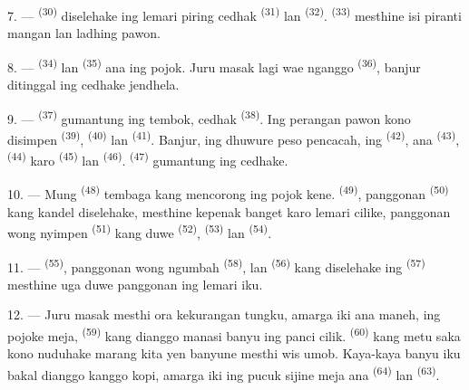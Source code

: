 7. ---  \textsuperscript{(30)} diselehake ing lemari
piring cedhak  \textsuperscript{(31)} lan  \textsuperscript{(32)}. 
\textsuperscript{(33)} mesthine isi piranti mangan lan ladhing pawon.

8. ---  \textsuperscript{(34)} lan 
\textsuperscript{(35)} ana ing pojok. Juru masak lagi wae nganggo
 \textsuperscript{(36)}, banjur ditinggal ing cedhake
jendhela.

9. ---  \textsuperscript{(37)} gumantung ing tembok,
cedhak  \textsuperscript{(38)}. Ing perangan pawon kono
disimpen  \textsuperscript{(39)},
 \textsuperscript{(40)} lan 
\textsuperscript{(41)}. Banjur, ing dhuwure peso pencacah, ing
 \textsuperscript{(42)}, ana 
\textsuperscript{(43)},  \textsuperscript{(44)} karo
 \textsuperscript{(45)} lan 
\textsuperscript{(46)}.  \textsuperscript{(47)} gumantung
ing cedhake.

10. --- Mung  \textsuperscript{(48)} tembaga kang
mencorong ing pojok kene.  \textsuperscript{(49)},
panggonan  \textsuperscript{(50)} kang kandel
diselehake, mesthine kepenak banget karo lemari cilike, panggonan wong
nyimpen  \textsuperscript{(51)} kang duwe
 \textsuperscript{(52)}, 
\textsuperscript{(53)} lan  \textsuperscript{(54)}.

\VUsaut{4.0mm}
\VUsaut{3.0mm}

11. ---  \textsuperscript{(55)}, panggonan wong ngumbah
 \textsuperscript{(58)}, lan 
\textsuperscript{(56)} kang diselehake ing 
\textsuperscript{(57)} mesthine uga duwe panggonan ing lemari iku.

12. --- Juru masak mesthi ora kekurangan tungku, amarga iki ana maneh,
ing pojoke meja,  \textsuperscript{(59)} kang
dianggo manasi banyu ing panci cilik. 
\textsuperscript{(60)} kang metu saka kono nuduhake marang kita yen
banyune mesthi wis umob. Kaya-kaya banyu iku bakal dianggo kanggo kopi,
amarga iki ing pucuk sijine meja ana 
\textsuperscript{(64)} lan  \textsuperscript{(63)}.


